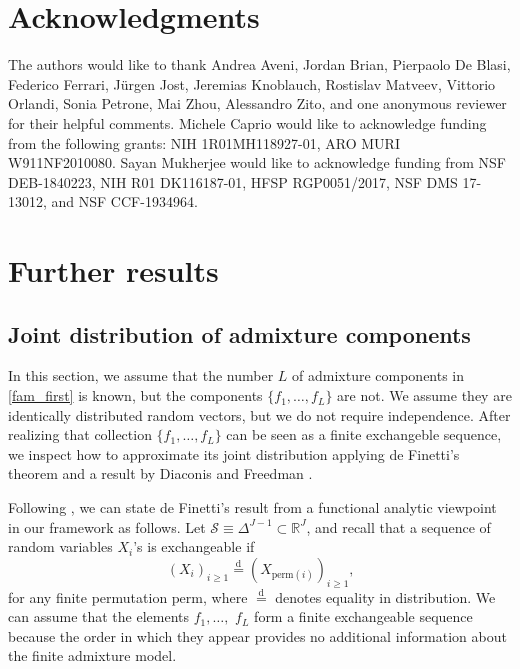\documentclass[12pt, reqno]{amsart}
\theoremstyle{definition}
\begin{document}
\section*{Acknowledgments} 
The authors would like to thank Andrea Aveni, Jordan Brian, Pierpaolo De Blasi, Federico Ferrari, Jürgen Jost, Jeremias Knoblauch, Rostislav Matveev, Vittorio Orlandi, Sonia Petrone, Mai Zhou, Alessandro Zito, and one anonymous reviewer for their helpful comments.  Michele Caprio would like to acknowledge funding from the following grants: NIH 1R01MH118927-01, ARO MURI W911NF2010080. Sayan Mukherjee would like to acknowledge funding from NSF DEB-1840223, NIH R01 DK116187-01, HFSP RGP0051/2017, NSF DMS 17-13012, and NSF CCF-1934964.


\appendix


\section{Further results}\label{app1}
\subsection{Joint distribution of admixture components}
\label{infiniteex}

In this section, we assume that the number $L$ of admixture components in \eqref{fam_first} is known, but the components $\{f_1,\ldots,f_L\}$ are not. We assume they are identically distributed random vectors, but we do not require independence. After realizing that collection $\{f_1,\ldots,f_L\}$ can be seen as a finite exchangeble sequence, we inspect how to approximate its joint distribution applying de Finetti's theorem and a result by Diaconis and Freedman \cite{diaconis1980}. 

Following \cite{aldous_2010}, we can state de Finetti's result from a functional analytic viewpoint in our framework as follows. Let $\mathcal{S} \equiv \Delta^{J-1} \subset \mathbb{R}^{J}$, and recall that a sequence of random variables $X_i$'s is exchangeable if
$$(X_i)_{i \geq 1} \overset{\text{d}}{=} (X_{\text{perm}(i)})_{i \geq 1} \text{,}$$
for any finite permutation $\text{perm}$, where $\overset{\text{d}}{=}$ denotes equality in distribution. We can assume that the elements ${f}_1,\ldots,$ ${f}_{L}$ form a {finite} exchangeable sequence because the order in which they appear provides no additional information about the finite admixture model.
\end{document}
